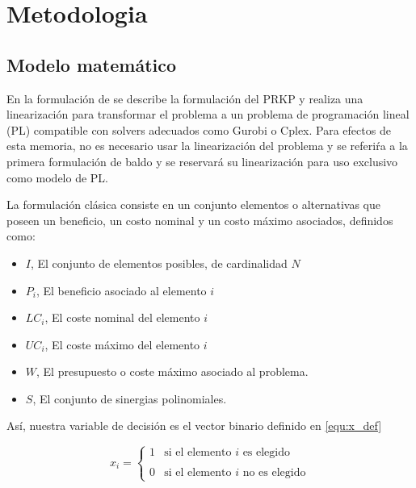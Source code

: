 \documentclass[spanish, a4paper, 12pt, twoside, openany,final]{book}
\numberwithin{equation}{section}                %
\begin{document}
\clearpage

\chapter{Metodologia}
    \section{Modelo matemático}
    
    En la formulación de \cite{baldo_polynomial_2023} se describe la formulación del PRKP y realiza una linearización para transformar el problema a un problema de programación lineal (PL) compatible con solvers adecuados como Gurobi o Cplex. Para efectos de esta memoria, no es necesario usar la linearización del problema y se referiŕa a la primera formulación de baldo y se reservará su linearización para uso exclusivo como modelo de PL.
    
    La formulación clásica consiste en un conjunto elementos o alternativas que poseen un beneficio, un costo nominal y un costo máximo asociados, definidos como:
    
    \begin{itemize}
    	\item $I$, El conjunto de elementos posibles, de cardinalidad $N$
    	\item $P_i$, El beneficio asociado al elemento $i$ %
    	\item $LC_i$, El coste nominal del elemento $i$    %
    	\item $UC_i$, El coste máximo del elemento $i$     %
    	\item $W$, El presupuesto o coste máximo asociado al problema.
    	\item $S$, El conjunto de sinergias polinomiales.
    \end{itemize}
    
    Así, nuestra variable de decisión es el vector binario definido en \ref{equ:x_def}
    
    \begin{equation}
    	\label{equ:x_def}
    	x_i = \left\{ 
    	\begin{array}{lc}
    		1 & \text{si el elemento $i$ es elegido}\\ \\ 
    		0 &  \text{si el elemento $i$ no es elegido}
    	\end{array} \right.
    \end{equation}
    
\end{document}
